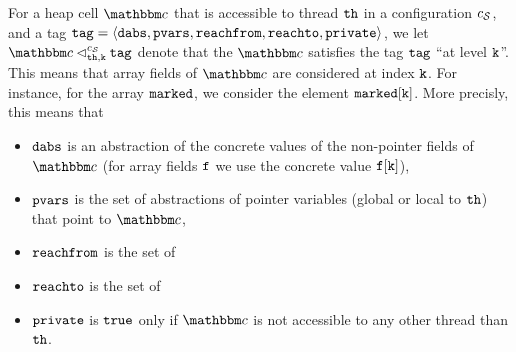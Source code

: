 For a heap cell $\cell$ that is accessible to thread ${\tt th}$ 
in a configuration $c_{\mathcal S}$, and a tag $\mathtt{tag} = \left\langle\mathtt{dabs},\mathtt{pvars},\mathtt{reachfrom},\mathtt{reachto},\mathtt{private}\right\rangle$,
we let $\cell \lsatfrag{\klevel}{\thread}{\sconf} \atag$ denote that the
$\cell$ satisfies the tag $\mathtt{tag}$ ``at level ${\tt k}$''.
This means that
array fields of $\cell$ are considered at index ${\tt k}$. For instance,
for the array $\tt marked$, we consider the element $\tt marked[{\tt k}]$.
More precisly, this means that
\begin{itemize}
\item
  $\mathtt{dabs}$ is an abstraction of the concrete values of the non-pointer fields of $\cell$ (for array fields $\tt f$ we use the concrete value $\tt f[k]$),
\item
  $\mathtt{pvars}$ is the set of abstractions of pointer variables (global or
  local to ${\tt th}$) that point to $\cell$,
\item
  $\mathtt{reachfrom}$ is the set of
\item
  $\mathtt{reachto}$ is the set of
\item
  $\mathtt{private}$ is ${\tt true}$ only if $\cell$ is 
not accessible to any other thread than ${\tt th}$.
\end{itemize}
